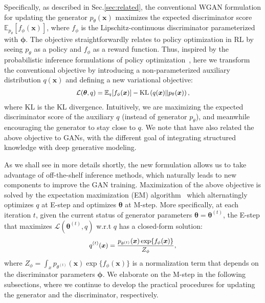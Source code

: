 \documentclass{article}
\newcommand{\0}{\bm{0}}
\newcommand{\E}{\mathbb{E}}
\newcommand{\KLD}{\text{KL}}
\newcommand{\x}{\bm{x}}
\begin{document}
Specifically, as described in Sec.\ref{sec:related}, the conventional WGAN formulation for updating the generator $p_\theta(\x)$ maximizes the expected discriminator score $\E_{p_\theta}[ f_\phi(\x) ]$, where $f_\phi$ is the Lipschitz-continuous discriminator parameterized with $\bm{\phi}$. The objective straightforwardly relates to policy optimization in RL by seeing $p_\theta$ as a policy and $f_\phi$ as a reward function. Thus, inspired by the probabilistic inference formulations of policy optimization~\cite{abdolmaleki2018maximum,hu2018deep,tan2018connecting}, here we transform the conventional objective by introducing a non-parameterized auxiliary distribution $q(\x)$ and defining a new variational objective:
\begin{equation}
\small
\begin{split}
    \mathcal{L}(\bm{\theta}, q) = \E_q[ f_\phi(\x) ] - \KLD\left( q(\x) \| p_\theta(\x) \right),
\end{split}
\label{eq:var-obj}
\end{equation}
where $\KLD$ is the KL divergence.
Intuitively, we are maximizing the expected discriminator score of the auxiliary $q$ (instead of generator $p_\theta$), and meanwhile encouraging the generator to stay close to $q$. We note that \citet{hu2018deep} have also related the above objective to GANs, with the different goal of integrating structured knowledge with deep generative modeling. 

As we shall see in more details shortly, the
new formulation allows us to take advantage of off-the-shelf inference methods, which naturally leads to new components to improve the GAN training. Maximization of the above objective is solved by the expectation maximization (EM) algorithm~\cite{neal1998view} which alternatingly optimizes $q$ at E-step and optimizes $\bm{\theta}$ at M-step. More specifically, at each iteration $t$, given the current status of generator parameters $\bm{\theta}=\bm{\theta}^{(t)}$, the E-step that maximizes $\mathcal{L}(\bm{\theta}^{(t)}, q)$ w.r.t $q$ has a closed-form solution:
\begin{equation}
\small
\begin{split}
q^{(t)}(\x) = \frac{p_{\theta^{(t)}}(\x)\exp\{ f_\phi(\x) \}}{Z_\phi},
\end{split}
\label{eq:q-sol}
\end{equation}
where $Z_\phi = \int_x p_{\theta^{(t)}}(\x)\exp\{ f_\phi(\x) \}$ is a normalization term that  depends on the discriminator parameters $\bm{\phi}$.
We elaborate on the M-step in the following subsections, where we continue to develop the practical procedures for updating the generator and the discriminator, respectively.
\end{document}
